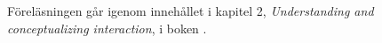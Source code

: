 Föreläsningen går igenom innehållet i kapitel 2, \emph{Understanding and 
conceptualizing interaction}, i boken  
\citep{Sharp2011idb}.
